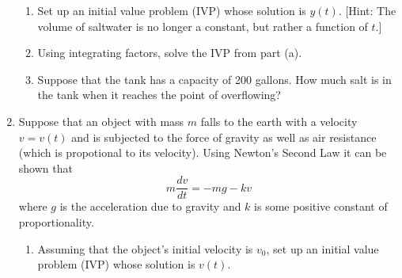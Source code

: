 \documentclass[12pt]{article}
\newif\ifans
\begin{document}
\begin{enumerate}
\begin{enumerate}
\item Set up an initial value problem (IVP) whose solution is $y(t)$.  [Hint: The volume of saltwater is no longer a constant, but rather a function of $t$.]

\ifans{\fbox{$\left\{\begin{array}{l}
\frac{dy}{dt}=24-\frac{3y}{50+t}\\
\\
y(0)=7
\end{array}\right.$; Detailed Solution: \textcolor{blue}{\href{http://www.math.drexel.edu/classes/Calculus/resources/Math123HW/Solutions/123_03_Integrating_Factors_11.pdf}{Here}}}} \fi


\item Using integrating factors, solve the IVP from part (a).  

\ifans{\fbox{$y(t)=6(50+t)-293(50)^3(50+t)^{-3}$}} \fi

\item Suppose that the tank has a capacity of 200 gallons.  How much salt is in the tank when it reaches the point of overflowing?

\ifans{\fbox{\parbox{1\linewidth}{The tank overflows at time $t=50$ minutes.  \\ At that time the amount of salt is $y\left(50\right)=\frac{4507}{8}\approx563.4$ pounds}}} \fi

\end{enumerate}

\item Suppose that an object with mass $m$ falls to the earth with a velocity $v=v(t)$ and is subjected to the force of gravity as well as air resistance (which is propotional to 
its velocity).  Using Newton's Second Law it can be shown that $$m\frac{dv}{dt}=-mg-kv$$ where $g$ is the acceleration due to gravity and $k$ is some positive constant of proportionality.

\begin{enumerate}

\item Assuming that the object's initial velocity is $v_0$, set up an initial value problem (IVP) whose solution is $v(t)$.

\ifans{\fbox{$\left\{\begin{array}{l}
\frac{dv}{dt}+\frac{k}{m}v=-g\\
\\
v(0)=v_0
\end{array}\right.$}} \fi


\end{enumerate}
\end{enumerate}
\end{document}
